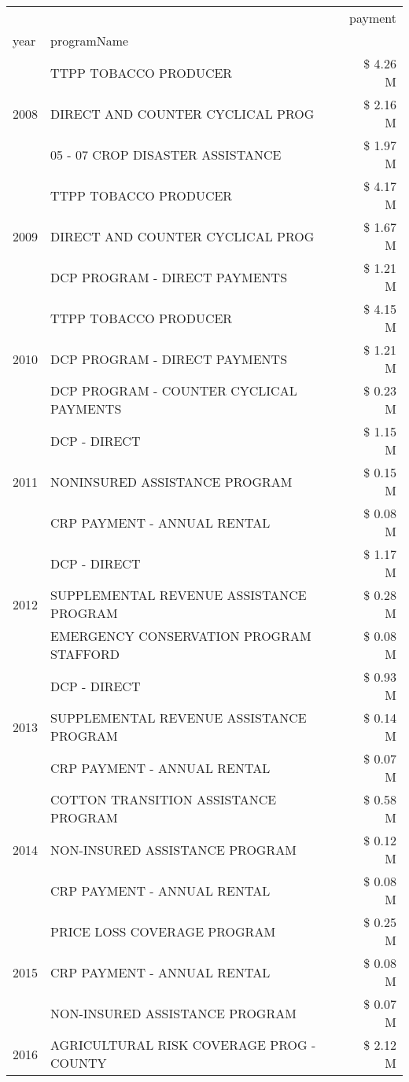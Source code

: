 \begin{tabular}{llr}
\toprule
 &  & payment \\
year & programName &  \\
\midrule
\multirow[t]{3}{*}{2008} & TTPP TOBACCO PRODUCER & \$ 4.26 M \\
 & DIRECT AND COUNTER CYCLICAL PROG & \$ 2.16 M \\
 & 05 - 07 CROP DISASTER ASSISTANCE & \$ 1.97 M \\
\cline{1-3}
\multirow[t]{3}{*}{2009} & TTPP TOBACCO PRODUCER & \$ 4.17 M \\
 & DIRECT AND COUNTER CYCLICAL PROG & \$ 1.67 M \\
 & DCP PROGRAM - DIRECT PAYMENTS & \$ 1.21 M \\
\cline{1-3}
\multirow[t]{3}{*}{2010} & TTPP TOBACCO PRODUCER & \$ 4.15 M \\
 & DCP PROGRAM - DIRECT PAYMENTS & \$ 1.21 M \\
 & DCP PROGRAM - COUNTER CYCLICAL PAYMENTS & \$ 0.23 M \\
\cline{1-3}
\multirow[t]{3}{*}{2011} & DCP - DIRECT & \$ 1.15 M \\
 & NONINSURED ASSISTANCE PROGRAM & \$ 0.15 M \\
 & CRP PAYMENT - ANNUAL RENTAL & \$ 0.08 M \\
\cline{1-3}
\multirow[t]{3}{*}{2012} & DCP - DIRECT & \$ 1.17 M \\
 & SUPPLEMENTAL REVENUE ASSISTANCE PROGRAM & \$ 0.28 M \\
 & EMERGENCY CONSERVATION PROGRAM STAFFORD & \$ 0.08 M \\
\cline{1-3}
\multirow[t]{3}{*}{2013} & DCP - DIRECT & \$ 0.93 M \\
 & SUPPLEMENTAL REVENUE ASSISTANCE PROGRAM & \$ 0.14 M \\
 & CRP PAYMENT - ANNUAL RENTAL & \$ 0.07 M \\
\cline{1-3}
\multirow[t]{3}{*}{2014} & COTTON TRANSITION ASSISTANCE PROGRAM & \$ 0.58 M \\
 & NON-INSURED ASSISTANCE PROGRAM & \$ 0.12 M \\
 & CRP PAYMENT - ANNUAL RENTAL & \$ 0.08 M \\
\cline{1-3}
\multirow[t]{3}{*}{2015} & PRICE LOSS COVERAGE PROGRAM & \$ 0.25 M \\
 & CRP PAYMENT - ANNUAL RENTAL & \$ 0.08 M \\
 & NON-INSURED ASSISTANCE PROGRAM & \$ 0.07 M \\
\cline{1-3}
\multirow[t]{3}{*}{2016} & AGRICULTURAL RISK COVERAGE PROG - COUNTY & \$ 2.12 M \\

\end{tabular}
